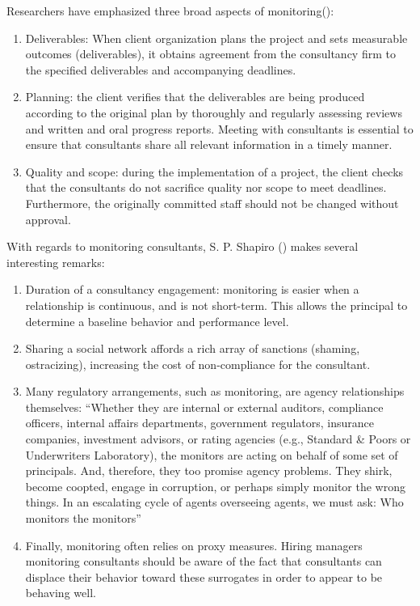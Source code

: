 \documentclass[
  man,floatsintext]{apa6}
\providecommand{\tightlist}{%
  \setlength{\itemsep}{0pt}\setlength{\parskip}{0pt}}
\begin{document}
Researchers have emphasized three broad aspects of monitoring():

\begin{enumerate}
\def\labelenumi{\arabic{enumi}.}
\tightlist
\item
  Deliverables: When client organization plans the project and sets measurable outcomes (deliverables), it obtains agreement from the consultancy firm to the specified deliverables and accompanying deadlines.
\item
  Planning: the client verifies that the deliverables are being produced according to the original plan by thoroughly and regularly assessing reviews and written and oral progress reports. Meeting with consultants is essential to ensure that consultants share all relevant information in a timely manner.
\item
  Quality and scope: during the implementation of a project, the client checks that the consultants do not sacrifice quality nor scope to meet deadlines. Furthermore, the originally committed staff should not be changed without approval.
\end{enumerate}

With regards to monitoring consultants, S. P. Shapiro () makes several interesting remarks:

\begin{enumerate}
\def\labelenumi{\arabic{enumi}.}
\tightlist
\item
  Duration of a consultancy engagement: monitoring is easier when a relationship is continuous, and is not short-term. This allows the principal to determine a baseline behavior and performance level.
\item
  Sharing a social network affords a rich array of sanctions (shaming, ostracizing), increasing the cost of non-compliance for the consultant.
\item
  Many regulatory arrangements, such as monitoring, are agency relationships themselves: ``Whether they are internal or external auditors, compliance officers, internal affairs departments, government regulators, insurance companies, investment advisors, or rating agencies (e.g., Standard \& Poors or Underwriters Laboratory), the monitors are acting on behalf of some set of principals. And, therefore, they too promise agency problems. They shirk, become coopted, engage in corruption, or perhaps simply monitor the wrong things. In an escalating cycle of agents overseeing agents, we must ask: Who monitors the monitors''
\item
  Finally, monitoring often relies on proxy measures. Hiring managers monitoring consultants should be aware of the fact that consultants can displace their behavior toward these surrogates in order to appear to be behaving well.
\end{enumerate}
\end{document}
